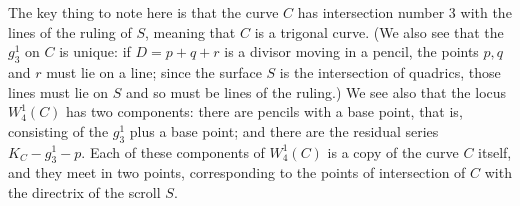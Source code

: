 \begin{exercise}
The key thing to note here is that the curve $C$ has intersection number 3 with the lines of the ruling of $S$, meaning that $C$ is a trigonal curve. (We also see that the $g^1_3$ on $C$ is unique: if $D = p + q + r$ is a divisor moving in a pencil, the points $p, q$ and $r$ must lie on a line; since the surface $S$ is the intersection of quadrics, those lines must lie on $S$ and so must be  lines  of the ruling.) We see also that the locus $W^1_4(C)$ has two components: there are pencils with a base point, that is, consisting of the $g^1_3$ plus a base point; and there are the residual series $K_C - g^1_3 - p$. Each of these components of $W^1_4(C)$ is a copy of the curve $C$ itself, and they meet in two points, corresponding to the points of intersection of $C$ with the directrix of the scroll $S$.
\end{exercise}


%




%


